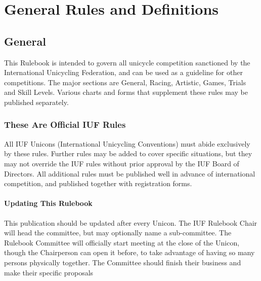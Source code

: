\chapter{General Rules and Definitions}
\section{General}
This Rulebook is intended to govern all unicycle competition sanctioned by the International Unicycling Federation, and can be used as a guideline for other competitions.
The major sections are General, Racing, Artistic, Games, Trials and Skill Levels.
Various charts and forms that supplement these rules may be published separately.

\subsection{These Are Official IUF Rules}
All IUF Unicons (International Unicycling Conventions) must abide exclusively by these rules.
Further rules may be added to cover specific situations, but they may not override the IUF rules without prior approval by the IUF Board of Directors.
All additional rules must be published well in advance of international competition, and published together with registration forms.

\subsubsection{Updating This Rulebook}
This publication should be updated after every Unicon.
The IUF Rulebook Chair will head the committee, but may optionally name a sub-committee.
The Rulebook Committee will officially start meeting at the close of the Unicon, though the Chairperson can open it before, to take advantage of having so many persons physically together.
The Committee should finish their business and make their specific proposals 

